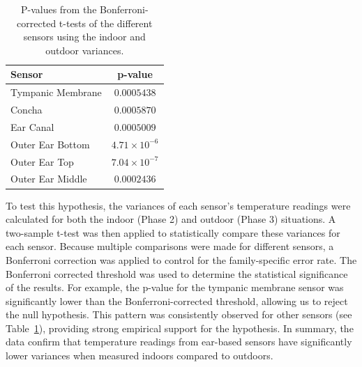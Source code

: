 \begin{table}[t]
\centering
\begin{tabularx}{\textwidth}{|X|c|}
\hline
\textbf{Sensor} & \textbf{p-value} \\
\hline
Tympanic Membrane & \(0.0005438\) \\
Concha & \(0.0005870\) \\
Ear Canal & \(0.0005009\) \\
Outer Ear Bottom & \(4.71 \times 10^{-6}\) \\
Outer Ear Top & \(7.04 \times 10^{-7}\) \\
Outer Ear Middle & \(0.0002436\) \\
\hline
\end{tabularx}
\caption{P-values from the Bonferroni-corrected t-tests of the different sensors using the indoor and outdoor variances.}
\label{subsec:Evaluation:Study1:Hypothesis2:pvalues}
\end{table}

To test this hypothesis, the variances of each sensor's temperature readings were calculated for both the indoor (Phase 2) and outdoor (Phase 3) situations.
A two-sample t-test was then applied to statistically compare these variances for each sensor.
Because multiple comparisons were made for different sensors, a Bonferroni correction was applied to control for the family-specific error rate.
The Bonferroni corrected threshold was used to determine the statistical significance of the results.
For example, the p-value for the tympanic membrane sensor was significantly lower than the Bonferroni-corrected threshold, allowing us to reject the null hypothesis.
This pattern was consistently observed for other sensors (see Table~\ref{subsec:Evaluation:Study1:Hypothesis2:pvalues}), providing strong empirical support for the hypothesis.
In summary, the data confirm that temperature readings from ear-based sensors have significantly lower variances when measured indoors compared to outdoors.

